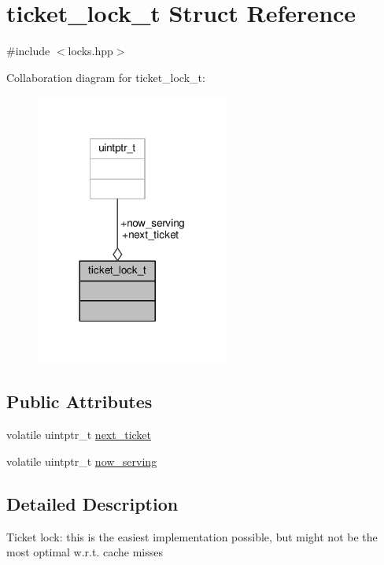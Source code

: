 \hypertarget{structticket__lock__t}{\section{ticket\-\_\-lock\-\_\-t Struct Reference}
\label{structticket__lock__t}
}


{\ttfamily \#include $<$locks.\-hpp$>$}



Collaboration diagram for ticket\-\_\-lock\-\_\-t\-:
\nopagebreak
\begin{figure}[H]
\begin{center}
\leavevmode
\includegraphics[width=180pt]{structticket__lock__t__coll__graph}
\end{center}
\end{figure}
\subsection*{Public Attributes}
\begin{DoxyCompactItemize}
\item 
volatile uintptr\-\_\-t \hyperlink{structticket__lock__t_a7bdc2eff47cf30738409cacb9431ce23}{next\-\_\-ticket}
\item 
volatile uintptr\-\_\-t \hyperlink{structticket__lock__t_a4204094477dcb3a7c481bf83e4b8975c}{now\-\_\-serving}
\end{DoxyCompactItemize}


\subsection{Detailed Description}
Ticket lock\-: this is the easiest implementation possible, but might not be the most optimal w.\-r.\-t. cache misses 

